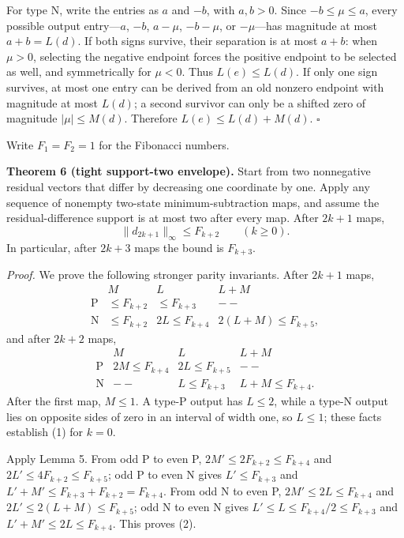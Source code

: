For type N, write the entries as $a$ and $-b$, with $a,b>0$. Since $-b\leq\mu\leq a$, every possible output entry---$a$, $-b$, $a-\mu$, $-b-\mu$, or $-\mu$---has magnitude at most $a+b=L(d)$. If both signs survive, their separation is at most $a+b$: when $\mu>0$, selecting the negative endpoint forces the positive endpoint to be selected as well, and symmetrically for $\mu<0$. Thus $L(e)\leq L(d)$. If only one sign survives, at most one entry can be derived from an old nonzero endpoint with magnitude at most $L(d)$; a second survivor can only be a shifted zero of magnitude $|\mu|\leq M(d)$. Therefore $L(e)\leq L(d)+M(d)$. $\square$

Write $F_1=F_2=1$ for the Fibonacci numbers.

\textbf{Theorem 6 (tight support-two envelope).} Start from two nonnegative residual vectors that differ by decreasing one coordinate by one. Apply any sequence of nonempty two-state minimum-subtraction maps, and assume the residual-difference support is at most two after every map. After $2k+1$ maps,
\[
 \lVert d_{2k+1}\rVert_\infty\leq F_{k+2}\qquad(k\geq0).
\]
In particular, after $2k+3$ maps the bound is $F_{k+3}$.

\textit{Proof.} We prove the following stronger parity invariants. After $2k+1$ maps,
\[
\begin{array}{c|ccc}
& M&L&L+M\\ \hline
\mathrm P&\leq F_{k+2}&\leq F_{k+3}&--\\
\mathrm N&\leq F_{k+2}&2L\leq F_{k+4}&2(L+M)\leq F_{k+5},
\end{array}\tag{1}
\]
and after $2k+2$ maps,
\[
\begin{array}{c|ccc}
& M&L&L+M\\ \hline
\mathrm P&2M\leq F_{k+4}&2L\leq F_{k+5}&--\\
\mathrm N&--&L\leq F_{k+3}&L+M\leq F_{k+4}.
\end{array}\tag{2}
\]
After the first map, $M\leq1$. A type-P output has $L\leq2$, while a type-N output lies on opposite sides of zero in an interval of width one, so $L\leq1$; these facts establish (1) for $k=0$.

Apply Lemma 5. From odd P to even P,
$2M'\leq2F_{k+2}\leq F_{k+4}$ and
$2L'\leq4F_{k+2}\leq F_{k+5}$; odd P to even N gives
$L'\leq F_{k+3}$ and $L'+M'\leq F_{k+3}+F_{k+2}=F_{k+4}$.
From odd N to even P, $2M'\leq2L\leq F_{k+4}$ and
$2L'\leq2(L+M)\leq F_{k+5}$; odd N to even N gives
$L'\leq L\leq F_{k+4}/2\leq F_{k+3}$ and
$L'+M'\leq2L\leq F_{k+4}$. This proves (2).

